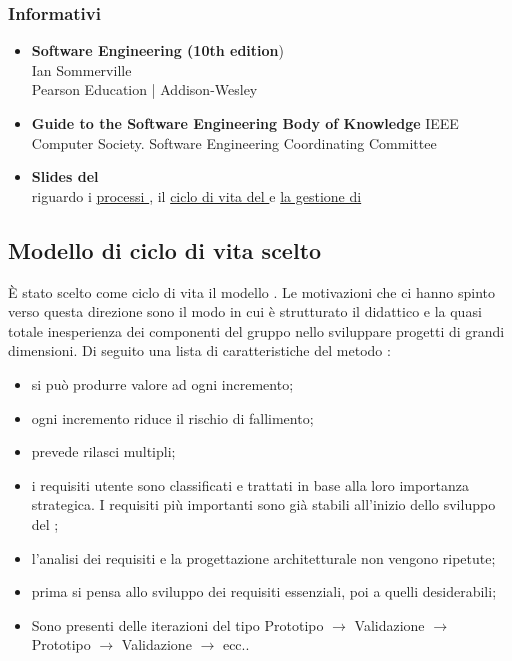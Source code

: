 		\subsubsection{Informativi}
			\begin{itemize}
				\item \textbf{Software Engineering (10th edition}) \\
				Ian Sommerville \\
				Pearson Education | Addison-Wesley
				\item \textbf{Guide to the Software Engineering Body of Knowledge}
				IEEE Computer Society. Software Engineering Coordinating Committee
				\item \textbf{Slides del \COMMITTENTE} \\ riguardo i  \href{http://www.math.unipd.it/~tullio/IS-1/2015/Dispense/L02.pdf}{processi }, il \href{http://www.math.unipd.it/~tullio/IS-1/2015/Dispense/L03.pdf}{ciclo di vita del } e \href{http://www.math.unipd.it/~tullio/IS-1/2015/Dispense/L04.pdf}{la gestione di }	
			\end{itemize}
	\subsection{Modello di ciclo di vita scelto}
	È stato scelto come ciclo di vita il modello . Le motivazioni che ci hanno spinto verso questa direzione sono il modo in cui è strutturato il  didattico e la quasi totale inesperienza dei componenti del gruppo nello sviluppare progetti  di grandi dimensioni. Di seguito una lista di caratteristiche del metodo :
	\begin{itemize}
		\item si può produrre valore ad ogni incremento;
		\item ogni incremento riduce il rischio di fallimento;
		\item prevede rilasci multipli;
		\item i requisiti utente sono classificati e trattati in base alla loro importanza strategica. I requisiti più importanti sono già stabili all'inizio dello sviluppo del ;
		\item l'analisi dei requisiti e la progettazione architetturale non vengono ripetute;
		\item prima si pensa allo sviluppo dei requisiti essenziali, poi a quelli desiderabili;
		\item Sono presenti delle iterazioni del tipo Prototipo $\rightarrow$ Validazione $\rightarrow$ Prototipo $\rightarrow$ Validazione $\rightarrow$ ecc..
	\end{itemize}
